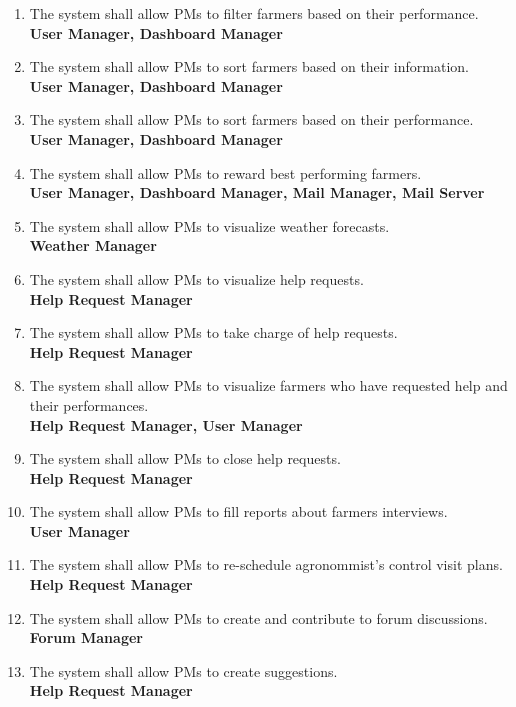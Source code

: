 \documentclass[10pt]{article} %
\begin{document}
\begin{enumerate}[label=\textbf{R\arabic*}]
    \item \label{req:pmFilter2} The system shall allow PMs to filter farmers based on their performance.    
    \\\textbf{User Manager, Dashboard Manager} 
    \item \label{req:pmSort1} The system shall allow PMs to sort farmers based on their information.    
    \\\textbf{User Manager, Dashboard Manager} 
    \item \label{req:pmSort2} The system shall allow PMs to sort farmers based on their performance.     
    \\\textbf{User Manager, Dashboard Manager} 
    \item \label{req:pmRewards} The system shall allow PMs to reward best performing farmers.    
    \\\textbf{User Manager, Dashboard Manager, Mail Manager, Mail Server} 
    \item \label{req:pmWeather} The system shall allow PMs to visualize weather forecasts.    
    \\\textbf{Weather Manager} 
    \item \label{req:pmHelp1} The system shall allow PMs to visualize help requests.
    \\\textbf{Help Request Manager} 
    \item \label{req:pmHelp2} The system shall allow PMs to take charge of help requests.
    \\\textbf{Help Request Manager} 
    \item \label{req:pmHelp3} The system shall allow PMs to visualize farmers who have requested help and their performances.
    \\\textbf{Help Request Manager, User Manager} 
    \item \label{req:pmHelp4} The system shall allow PMs to close help requests.
    \\\textbf{Help Request Manager}
    \item \label{req:pmInterview} The system shall allow PMs to fill reports about farmers interviews.    
    \\\textbf{User Manager}
    \item \label{req:pmVisits} The system shall allow PMs to re-schedule agronommist's control visit plans.    
    \\\textbf{Help Request Manager}
    \item \label{req:pmForum} The system shall allow PMs to create and contribute to forum discussions.    
    \\\textbf{Forum Manager}
    \item \label{req:pmSuggestions} The system shall allow PMs to create suggestions.
    \\\textbf{Help Request Manager}
\end{enumerate}
\end{document}
